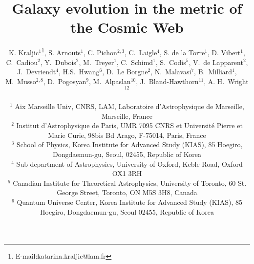 \documentclass[useAMS,usenatbib]{mnras}
\begin{document}
%
%
\title[Galaxy evolution in the metric of the Cosmic Web]{ 
       Galaxy evolution in the metric of the Cosmic Web}

\author[K. Kraljic, S. Arnouts, C. Pichon et al.]{
\parbox[t]{\textwidth}{
\hskip -0.02cm
K. Kraljic$^{1}$\thanks{E-mail:katarina.kraljic@lam.fr},
         S. Arnouts$^{1}$, 
         C. Pichon$^{2,3}$,
         C.~Laigle$^{4}$,
         S. de la Torre$^{1}$,
         D. Vibert$^{1}$,
         C.~Cadiou$^{2}$,
         Y.~Dubois$^{2}$, 
         M.~Treyer$^{1}$,  
         C.~Schimd$^{1}$,
         S.~Codis$^{5}$,
         V.~de Lapparent$^{2}$,
         J.~Devriendt$^{4}$, 
         H.S.~Hwang$^{6}$,
         D.~Le Borgne$^{2}$,
         N.~Malavasi$^7$,
         B.~Milliard$^1$,
         M.~Musso$^{2,8}$,
         D.~Pogosyan$^{9}$,
          M.~Alpaslan$^{10}$,
         J.~Bland-Hawthorn$^{11}$,
         A. H.~Wright$^{12}$
         }
\vspace*{6pt} \\ 
$^{1}$ {Aix Marseille Univ, CNRS, LAM, Laboratoire d'Astrophysique de Marseille, Marseille, France} \\
$^{2}$ {Institut d'Astrophysique de Paris, UMR 7095 CNRS et Universit\'e Pierre et Marie Curie, 98bis Bd Arago, F-75014, Paris, France}\\
$^{3}$ {School of Physics, Korea Institute for Advanced Study (KIAS), 85 Hoegiro, Dongdaemun-gu, Seoul, 02455, Republic of Korea}\\
$^{4}$ {Sub-department of Astrophysics, University of Oxford, Keble Road, Oxford OX1 3RH}\\
$^{5}$ {Canadian Institute for Theoretical Astrophysics, University of Toronto, 60 St. George Street, Toronto, ON M5S 3H8, Canada}\\
$^{6}$ {Quantum Universe Center, Korea Institute for Advanced Study (KIAS), 85 Hoegiro, Dongdaemun-gu, Seoul 02455, Republic of Korea}\\
}
\end{document}
